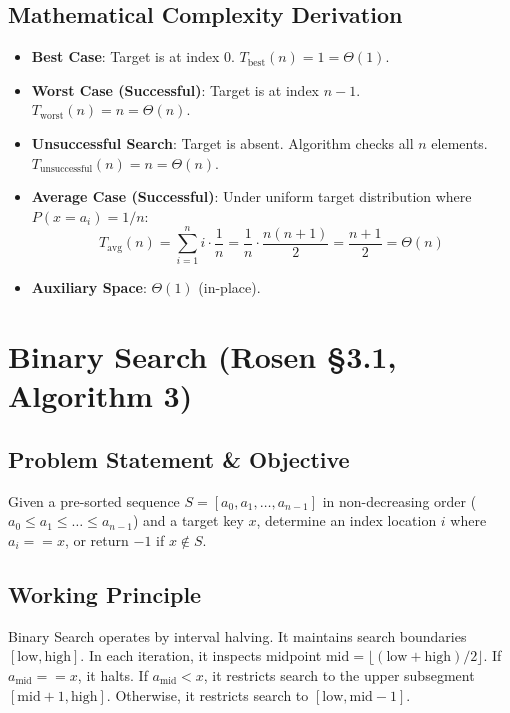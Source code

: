 \subsection{Mathematical Complexity Derivation}
\begin{itemize}
    \item \textbf{Best Case}: Target is at index $0$. $T_{\text{best}}(n) = 1 = \Theta(1)$.
    \item \textbf{Worst Case (Successful)}: Target is at index $n - 1$. $T_{\text{worst}}(n) = n = \Theta(n)$.
    \item \textbf{Unsuccessful Search}: Target is absent. Algorithm checks all $n$ elements. $T_{\text{unsuccessful}}(n) = n = \Theta(n)$.
    \item \textbf{Average Case (Successful)}: Under uniform target distribution where $P(x = a_i) = 1/n$:
    $$T_{\text{avg}}(n) = \sum_{i=1}^n i \cdot \frac{1}{n} = \frac{1}{n} \cdot \frac{n(n + 1)}{2} = \frac{n + 1}{2} = \Theta(n)$$
    \item \textbf{Auxiliary Space}: $\Theta(1)$ (in-place).
\end{itemize}

\section{Binary Search (Rosen §3.1, Algorithm 3)}
\label{sec:binary_search}

\subsection{Problem Statement \& Objective}
Given a pre-sorted sequence $S = [a_0, a_1, \dots, a_{n-1}]$ in non-decreasing order ($a_0 \le a_1 \le \dots \le a_{n-1}$) and a target key $x$, determine an index location $i$ where $a_i == x$, or return $-1$ if $x \notin S$.

\subsection{Working Principle}
Binary Search operates by interval halving. It maintains search boundaries $[\text{low}, \text{high}]$. In each iteration, it inspects midpoint $\text{mid} = \lfloor (\text{low} + \text{high}) / 2 \rfloor$. If $a_{\text{mid}} == x$, it halts. If $a_{\text{mid}} < x$, it restricts search to the upper subsegment $[\text{mid} + 1, \text{high}]$. Otherwise, it restricts search to $[\text{low}, \text{mid} - 1]$.

